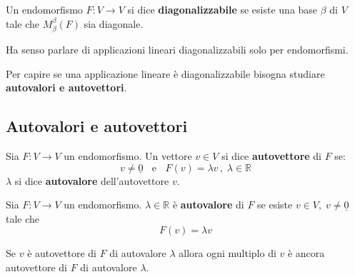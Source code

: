 \documentclass[
  a4paper,
]{article}
\begin{document}
\begin{definitionbox}
Un endomorfismo \(F: V \to V\) si dice \textbf{diagonalizzabile} se
esiste una base \(\beta\) di \(V\) tale che \(M^{{\beta}}_{\beta}(F)\)
sia diagonale.
\end{definitionbox}

\begin{observationbox}
Ha senso parlare di applicazioni lineari diagonalizzabili solo per
endomorfismi.
\end{observationbox}

Per capire se una applicazione lineare è diagonalizzabile bisogna
studiare \textbf{autovalori e autovettori}.

\hypertarget{autovalori-e-autovettori-1}{%
\subsection{Autovalori e autovettori}\label{autovalori-e-autovettori-1}}

\begin{definitionbox}
Sia \(F: V \to V\) un endomorfismo. Un vettore \(v \in V\) si dice
\textbf{autovettore} di \(F\) se: \[
v \not = \underline{0} \;\;\text{ e }\;\; F(v) = \lambda v \,,\; \lambda \in \mathbb{R}
\] \(\lambda\) si dice \textbf{autovalore} dell'autovettore \(v\).
\end{definitionbox}

\begin{definitionbox}
Sia \(F: V \to V\) un endomorfismo. \(\lambda \in \mathbb{R}\) è
\textbf{autovalore} di \(F\) se esiste
\(v \in V, \;v \not = \underline{0}\) tale che \[
F(v) = \lambda v
\]
\end{definitionbox}

\begin{observationbox}
Se \(v\) è autovettore di \(F\) di autovalore \(\lambda\) allora ogni
multiplo di \(v\) è ancora autovettore di \(F\) di autovalore
\(\lambda\).
\end{observationbox}
\end{document}
